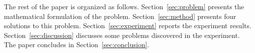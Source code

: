 


The rest of the paper is organized as follows.
Section~\ref{sec:problem} presents the mathematical formulation of the problem. Section~\ref{sec:method} presents four solutions to this problem. Section~\ref{sec:experiment} reports the experiment results. Section~\ref{sec:discussion} discusses some problems discovered in the experiment. The paper concludes in Section~\ref{sec:conclusion}.

